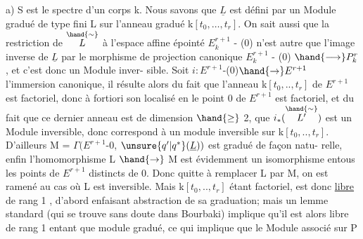 a) S est le spectre d'un corps k. Nous savons que $\underline{L}$ est défini
par un Module gradué de type fini L sur l'anneau gradué k$[t_0,\ldots,t_r]$.
On sait aussi que la restriction  de $\overset{\hand{\sim}}{L}$ à l'espace affine épointé
$E_k^{r+1}$ - (0) n'est autre que l'image inverse de $\underline{L}$ par le morphisme de
projection canonique  $E_k^{r+1}$ - (0) $\hand{\longrightarrow} P_k^r$ , et c'est donc un Module inver-%
sible. Soit $i : E^{r+1}$-(0)$\hand{\to} E^{r+1}$ l'immersion canonique, il résulte
alors du fait que l'anneau  k$[t_0,..,t_r]$ de $E^{r+1}$ est factoriel, donc à
fortiori son localisé en le point 0 de $E^{r+1}$ est factoriel, et du fait
que ce dernier anneau est de dimension $\hand{\geq}$ 2, que $i_*(\overset{\hand{\sim}}{L'})$ est un Module
inversible,  donc correspond à un module inversible  sur
k$[t_0,..,t_r]$. D'ailleurs M = $\Gamma(E^{r+1}$-0, $\unsure{q'|q^*}(\underline{L}))$ est gradué de façon natu-%
relle, enfin l'homomorphisme L $\hand{\to}$ M est évidemment un isomorphisme
entous les  points de $E^{r+1}$ distincts de 0. Donc quitte à
remplacer L par M, on est ramené au cas où L est inversible. Mais
k$[t_0,..,t_r]$ étant factoriel,  est donc \uline{libre} de rang 1 , d'abord
enfaisant abstraction de sa graduation; mais un lemme standard (qui se
trouve sans doute dans Bourbaki) implique qu'il est alors libre de rang 1
entant que module gradué, ce qui implique que le Module associé sur P

